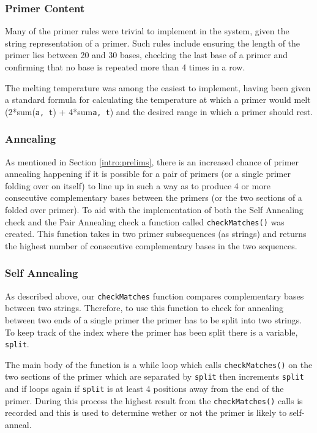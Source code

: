 \subsubsection{Primer Content}
Many of the primer rules were trivial to implement in the system, given
the string representation of a primer. Such rules include ensuring the
length of the primer lies between 20 and 30 bases, checking the last base
of a primer and confirming that no base is repeated more than 4 times
in a row. 

The melting temperature was among the easiest to implement, having been
given a standard formula for calculating the temperature at which a primer
would melt (2*sum(\verb£a, t£) + 4*sum\verb£a, t£) and the desired range
in which a primer should rest.

\subsubsection{Annealing}

As mentioned in Section \ref{intro:prelims}, there is an increased
chance of primer annealing happening if it is possible for a pair of
primers (or a single primer folding over on itself) to line up in such a
way as to produce 4 or more consecutive complementary bases between the
primers (or the two sections of a folded over primer). To aid with the
implementation of both the Self Annealing check and the Pair Annealing
check a function called \texttt{checkMatches()} was created. This function
takes in two primer subsequences (as strings) and returns the highest 
number of consecutive complementary bases in the two sequences.

\subsubsection{Self Annealing}

As described above, our \texttt{checkMatches} function compares
complementary bases between two strings. Therefore, to use this function
to check for annealing between two ends of a single primer the primer
has to be split into two strings. To keep track of the index where the
primer has been split there is a variable, \texttt{split}.

The main body of the function is a while loop which calls
\texttt{checkMatches()} on the two sections of the primer which are
separated by \texttt{split} then increments \texttt{split} and if loops
again if \texttt{split} is at least 4 positions away from the end of the
primer. During this process the highest result from the
\texttt{checkMatches()} calls is recorded and this is used to determine
wether or not the primer is likely to self-anneal.

